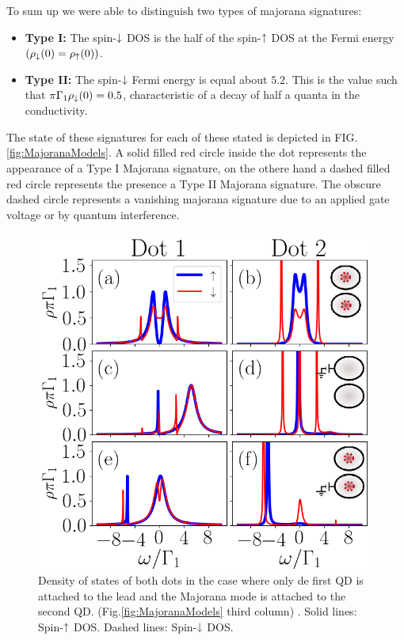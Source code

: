 \documentclass[showpacs,aps,prb,reprint,superscriptaddress]{revtex4-1}
\begin{document}
    To sum up we were able to distinguish two types of majorana signatures:
     \begin{itemize}
         \item \textbf{Type I: }  The spin-$\downarrow$ DOS is the half of the spin-$\uparrow$ DOS  at the Fermi energy $(\rho_\downarrow(0)=\rho_\uparrow(0))$. 
         \item \textbf{Type II: } The spin-$\downarrow$ Fermi energy is equal about $5.2$. This is the value such that  $\pi  \Gamma_1 \rho_\downarrow(0) = 0.5$, characteristic of a decay of half a quanta in the conductivity. 
     \end{itemize}
     The state of these signatures for each of these stated is depicted in FIG.\ref{fig:MajoranaModels}. A solid filled red circle inside the dot represents the appearance of a Type I Majorana signature, on the othere hand a dashed filled red circle represents the presence a  Type II Majorana signature. The obscure dashed circle represents a vanishing majorana signature due to an applied gate voltage or by quantum interference.
    
\begin{figure}[bt]
\begin{center}
\includegraphics[scale=0.48]{Graficos/t2>0.png}
\caption{  \label{fig:IndirectMajorana} Density of states of both dots in the case where only de first QD is attached to the lead and the Majorana mode is attached to the second QD.  (Fig.\ref{fig:MajoranaModels} third column) . Solid lines: Spin-$\uparrow$ DOS. Dashed lines: Spin-$\downarrow$ DOS. 
}
%
\label{fig:GenModel}
\end{center}
\end{figure}
 
\end{document}
